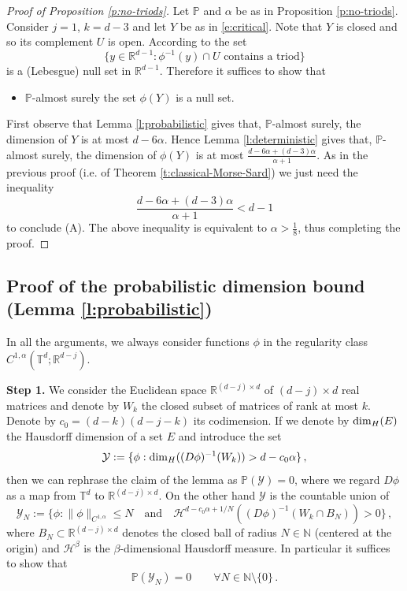 \documentclass[11pt,reqno]{amsart}
\theoremstyle{definition}
\numberwithin{equation}{section}
\begin{document}
\begin{proof}[Proof of Proposition \ref{p:no-triods}]
Let $\mathbb P$ and $\alpha$ be as in Proposition \ref{p:no-triods}. Consider $j=1$, $k= d-3$ and let $Y$ be as in \eqref{e:critical}. Note that $Y$ is closed and so its complement $U$ is open. According to \cite[Proof of Lemma 2.16]{ABC-2} the set 
\[
\{y\in \mathbb R^{d-1} : \phi^{-1} (y)\cap U \mbox{ contains a triod}\}
\]
is a (Lebesgue) null set in $\mathbb R^{d-1}$. Therefore it suffices to show that 
\begin{itemize}
\item[(A)] $\mathbb P$-almost surely the set $\phi (Y)$ is a null set.
\end{itemize}
First observe that Lemma \ref{l:probabilistic} gives that, $\mathbb P$-almost surely, the dimension of $Y$ is at most $d-6\alpha$. Hence Lemma \ref{l:deterministic} gives that, $\mathbb P$-almost surely, the dimension of $\phi (Y)$ is at most $\frac{d-6\alpha + (d-3)\alpha}{\alpha+1}$. As in the previous proof (i.e. of Theorem \ref{t:classical-Morse-Sard}) we just need the inequality
\[
\frac{d-6\alpha + (d-3)\alpha}{\alpha+1} < d-1
\]
to conclude (A). The above inequality is equivalent to $\alpha > \frac{1}{8}$, thus completing the proof.
\end{proof}

\subsection{Proof of the probabilistic dimension bound (Lemma \ref{l:probabilistic})} In all the arguments, we always consider functions $\phi$ in the regularity class $C^{1,\alpha} (\mathbb{T}^d; \mathbb{R}^{d-j})$.

\medskip

{\bf Step 1.} We consider the Euclidean space $\mathbb R^{(d-j)\times d}$ of $(d-j)\times d$ real matrices and denote by $W_k$ the closed subset of matrices of rank at most $k$. Denote by $c_0 = (d-k)(d-j-k)$ its codimension. 
If we denote by ${\rm dim}_H (E)$ the Hausdorff dimension of a set $E$ and introduce the set 
\[
\mathcal{Y} := \{\phi : {\rm dim}_H ((D\phi)^{-1} (W_k))> d-c_0\alpha\}\, ,
\]
then we can rephrase the claim of the lemma as $\mathbb P (\mathcal{Y})=0$, where we regard $D \phi$ as a map from $\mathbb{T}^d$ to $\mathbb{R}^{(d-j) \times d}$. On the other hand $\mathcal{Y}$ is the countable union of
\begin{equation}\label{e:pieces}
\mathcal{Y}_N := \{\phi : \|\phi\|_{C^{1,\alpha}} \leq N 
\quad \mbox{and}\quad \mathcal{H}^{d-c_0 \alpha + 1/N} ((D\phi)^{-1} (W_k\cap B_N)) > 0\}\, ,
\end{equation}
where $B_N\subset \mathbb R^{(d-j)\times d}$ denotes the closed ball of radius $N\in \mathbb N$ (centered at the origin) and $\mathcal{H}^\beta$ is the $\beta$-dimensional Hausdorff measure. In particular it suffices to show that
\begin{equation}\label{e:bounded-claim}
\mathbb P (\mathcal{Y}_N)=0 \qquad \forall N\in \mathbb N\setminus \{0\}\, .
\end{equation}
\end{document}
